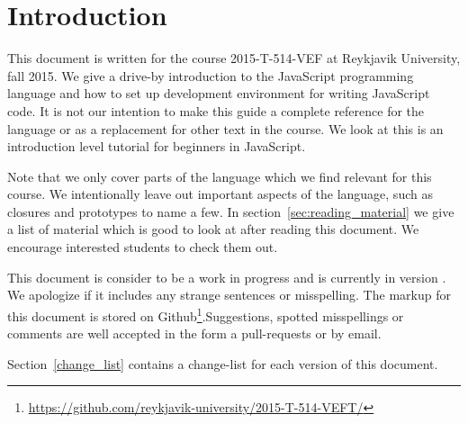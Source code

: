 \section{Introduction}\label{sec:introduction}
This document is written for the course 2015-T-514-VEF at Reykjavik University, fall 2015. We give a drive-by introduction to the JavaScript programming language and how to set up development environment for writing JavaScript code. It is not our intention to make this guide a complete reference for the language or as a replacement for other text in the course. We look at this is an introduction level tutorial for beginners in JavaScript.

Note that we only cover parts of the language which we find relevant for this course. We intentionally leave out important aspects of the language, such as closures and prototypes to name a few. In section~\ref{sec:reading_material} we give a list of material which is good to look at after reading this document. We encourage interested students to check them out.

This document is consider to be a work in progress and is currently in version \currentVersion. We apologize if it includes any strange sentences or misspelling. The markup for this document is stored on Github\footnote{\url{https://github.com/reykjavik-university/2015-T-514-VEFT/}}.Suggestions, spotted misspellings or comments are well accepted in the form a pull-requests or by email.

Section~\ref{change_list} contains a change-list for each version of this document.
